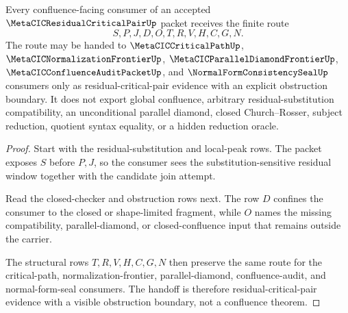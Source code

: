 \begin{theorem}
\label{thm:metacic-residual-critical-pair-frontier-handoff}
Every confluence-facing consumer of an accepted $\MetaCICResidualCriticalPairUp$ packet receives the finite route
$$
S,P,J,D,O,T,R,V,H,C,G,N .
$$
The route may be handed to $\MetaCICCriticalPathUp$, $\MetaCICNormalizationFrontierUp$, $\MetaCICParallelDiamondFrontierUp$, $\MetaCICConfluenceAuditPacketUp$, and $\NormalFormConsistencySealUp$ consumers only as residual-critical-pair evidence with an explicit obstruction boundary. It does not export global confluence, arbitrary residual-substitution compatibility, an unconditional parallel diamond, closed Church--Rosser, subject reduction, quotient syntax equality, or a hidden reduction oracle.
\end{theorem}
\begin{proof}
Start with the residual-substitution and local-peak rows. The packet exposes $S$ before $P,J$, so the consumer sees the substitution-sensitive residual window together with the candidate join attempt.

Read the closed-checker and obstruction rows next. The row $D$ confines the consumer to the closed or shape-limited fragment, while $O$ names the missing compatibility, parallel-diamond, or closed-confluence input that remains outside the carrier.

The structural rows $T,R,V,H,C,G,N$ then preserve the same route for the critical-path, normalization-frontier, parallel-diamond, confluence-audit, and normal-form-seal consumers. The handoff is therefore residual-critical-pair evidence with a visible obstruction boundary, not a confluence theorem.
\end{proof}

